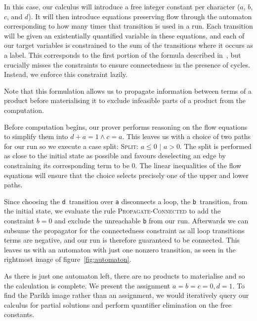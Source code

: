 \documentclass{easychair}
\begin{document}
  In this case, our calculus will introduce a free integer constant per
  character ($a$, $b$, $c$, and $d$). It will then introduce equations
  preserving flow through the automaton corresponding to how many times that
  transition is used in a run. Each transition will be given an
  existentially quantified variable in these equations, and each of our target
  variables is constrained to the sum of the transitions where it occurs as a
  label. This corresponds to the first portion of the formula described
  in~\cite{generate-parikh-image}, but crucially misses the constraints to
  ensure connectedness in the presence of cycles. Instead, we enforce this
  constraint lazily.

  Note that this formulation allows us to propagate information between terms of
  a product before materialising it to exclude infeasible parts of a product from the computation.
  
Before computation begins, our prover performs reasoning on the flow equations
to simplify them into $d + a = 1 \land c = a$. This leaves us with a choice of
two paths for our run so we execute a case split: \textsc{Split}: $a \leq 0$
$\mid$ $a > 0$. The split is performed as close to the initial state as possible
and favours deselecting an edge by constraining its corresponding term to be 0.
The linear inequalities of the flow equations will ensure that the choice
selects precisely one of the upper and lower paths.

Since choosing the \texttt{d}~transition over \texttt{a} disconnects a loop, the \texttt{b}~transition, from the initial state, we evaluate the rule \textsc{Propagate-Connected} to add the constraint $b = 0$ and exclude the unreachable \texttt{b} from our run. Afterwards we can subsume the propagator for the connectedness constraint as all loop transitions terms are negative, and our run is therefore guaranteed to be connected. This leaves us with an automaton with just one nonzero transition, as seen in the rightmost image of figure~\ref{fig:automaton}.

As there is just one automaton left, there are no products to materialise and so
the calculation is complete. We present the assignment $a = b = c = 0, d=1$. To
find the Parikh image rather than an assignment, we would iteratively query
our calculus for partial solutions and perform quantifier elimination on the
free constants.

%
\printbibliography
\end{document}
